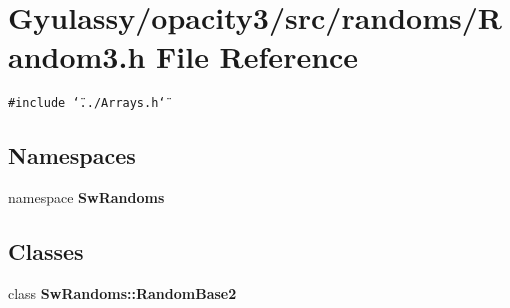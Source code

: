 \section{Gyulassy/opacity3/src/randoms/Random3.h File Reference}
\label{Random3_8h}
{\tt \#include \char`\"{}../Arrays.h\char`\"{}}\par
\subsection*{Namespaces}
\begin{CompactItemize}
\item 
namespace {\bf SwRandoms}
\end{CompactItemize}
\subsection*{Classes}
\begin{CompactItemize}
\item 
class {\bf SwRandoms::RandomBase2}
\end{CompactItemize}
